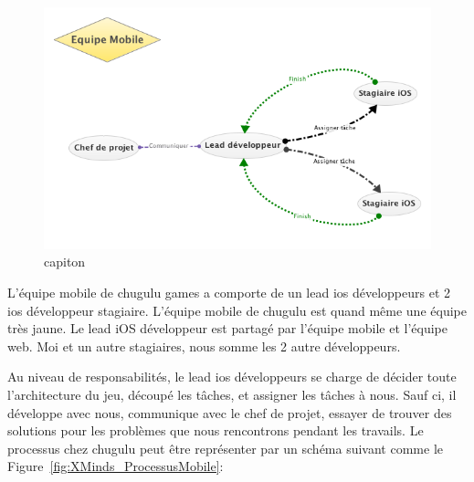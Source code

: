 \begin{figure}[htbp]
	\centering
		\includegraphics[width=6in]{XMinds/EquipeMobile.png}
	\caption{capiton}
	\label{fig:XMinds_EquipeMobile}
\end{figure}


L'équipe mobile de chugulu games a comporte de un lead ios développeurs et 2 ios développeur stagiaire. L'équipe mobile de chugulu est quand même une équipe très jaune. Le lead iOS développeur est partagé par l'équipe mobile et l'équipe web. Moi et un autre stagiaires, nous somme les 2 autre développeurs. 

Au niveau de responsabilités, le lead ios développeurs se charge de décider toute l'architecture du jeu, découpé les tâches, et assigner les tâches à nous. Sauf ci, il développe avec nous, communique avec le chef de projet, essayer de trouver des solutions pour les problèmes que nous rencontrons pendant les travails. Le processus chez chugulu peut être représenter par un schéma suivant comme le Figure~\ref{fig:XMinds_ProcessusMobile}:

